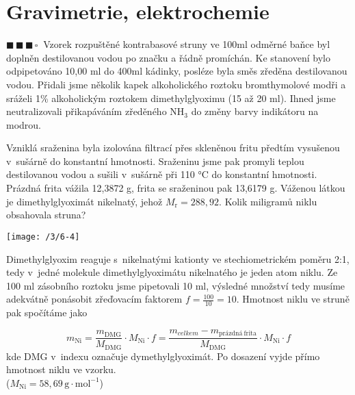 \documentclass{book}
\newcommand{\tri}{$\blacksquare \, \blacksquare \, \blacksquare \, \square \; \; $}
\renewenvironment{quotation}{\par}{\par} %
\begin{document}
\section{Gravimetrie, elektrochemie}

\begin{quotation}
\tri Vzorek rozpuštěné kontrabasové struny ve 100ml odměrné baňce byl doplněn
destilovanou vodou po značku a řádně promíchán. Ke stanovení bylo
odpipetováno 10,00 ml do 400ml kádinky, posléze byla směs zředěna
destilovanou vodou. Přidali jsme několik kapek alkoholického roztoku
bromthymolové modři a sráželi 1\% alkoholickým roztokem dimethylglyoximu
(15 až 20 ml). Ihned jsme neutralizovali přikapáváním zředěného NH$_{3}$
do změny barvy indikátoru na modrou.

Vzniklá sraženina byla izolována filtrací
přes skleněnou fritu předtím vysušenou v~sušárně do konstantní hmotnosti.
Sraženinu jsme pak promyli teplou destilovanou vodou a sušili v~sušárně
při 110 °C do konstantní hmotnosti. Prázdná frita vážila 12,3872 g,
frita se sraženinou pak 13,6179 g. Váženou látkou je dimethylglyoximát
nikelnatý, jehož $M_{\mathrm{r}}=288,92$. Kolik miligramů niklu obsahovala
struna? 
\end{quotation} \dotfill \par 
\noindent \begin{center}

\texttt{[image: /3/6-4]}

\par\end{center}

Dimethylglyoxim reaguje s~nikelnatými kationty ve stechiometrickém
poměru 2:1, tedy v~jedné molekule dimethylglyoximátu nikelnatého je
jeden atom niklu. Ze 100 ml zásobního roztoku jsme pipetovali 10 ml, výsledné množství tedy musíme adekvátně ponásobit zřeďovacím faktorem $f=\frac{100}{10}=10$. Hmotnost niklu
ve struně pak spočítáme jako

\[
m_{\mathrm{Ni}}=\frac{m_{\mathrm{DMG}}}{M_{\mathrm{DMG}}}\cdot M_{\mathrm{Ni}}\cdot f=\frac{m_{celkem}-m_{\mathrm{prázdná\ frita}}}{M_{\mathrm{DMG}}}\cdot M_{\mathrm{Ni}}\cdot f
\]
kde DMG v~indexu označuje dymethylglyoximát. Po dosazení vyjde přímo
hmotnost niklu ve vzorku.\\($M_{\mathrm{Ni}}=58,69\,\mathrm{g\cdot mol^{-1}}$)
\end{document}
